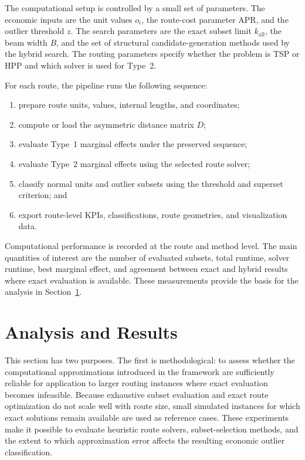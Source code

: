 \documentclass[preprint,12pt]{elsarticle}
\begin{document}
The computational setup is controlled by a small set of parameters. The economic inputs are the unit values $o_i$, the route-cost parameter $\mathrm{APR}$, and the outlier threshold $z$. The search parameters are the exact subset limit $k_{\mathrm{all}}$, the beam width $B$, and the set of structural candidate-generation methods used by the hybrid search. The routing parameters specify whether the problem is TSP or HPP and which solver is used for Type~2.

For each route, the pipeline runs the following sequence:
\begin{enumerate}[label=(\roman*)]
\item prepare route units, values, internal lengths, and coordinates;
\item compute or load the asymmetric distance matrix $D$;
\item evaluate Type~1 marginal effects under the preserved sequence;
\item evaluate Type~2 marginal effects using the selected route solver;
\item classify normal units and outlier subsets using the threshold and superset criterion; and
\item export route-level KPIs, classifications, route geometries, and visualization data.
\end{enumerate}

Computational performance is recorded at the route and method level. The main quantities of interest are the number of evaluated subsets, total runtime, solver runtime, best marginal effect, and agreement between exact and hybrid results where exact evaluation is available. These measurements provide the basis for the analysis in Section~\ref{sec:analysis-results}.

\section{Analysis and Results}
\label{sec:analysis-results}

This section has two purposes. The first is methodological: to assess whether the computational approximations introduced in the framework are sufficiently reliable for application to larger routing instances where exact evaluation becomes infeasible. Because exhaustive subset evaluation and exact route optimization do not scale well with route size, small simulated instances for which exact solutions remain available are used as reference cases. These experiments make it possible to evaluate heuristic route solvers, subset-selection methods, and the extent to which approximation error affects the resulting economic outlier classification.
\end{document}
